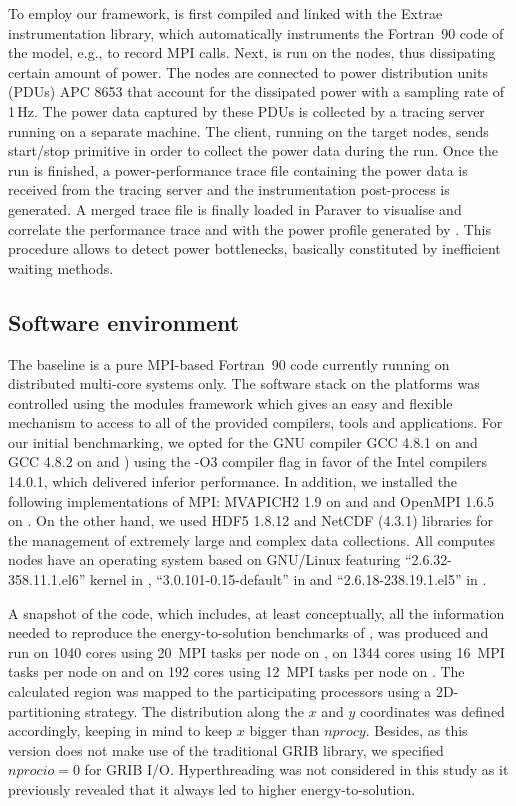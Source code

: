 To employ our framework, \cosmoart is first compiled and linked with the Extrae instrumentation library, which automatically  instruments the Fortran~90 code of the model, e.g., to record MPI calls.  Next, \cosmoart  is  run on  the  nodes,  thus dissipating  certain amount  of power. The  nodes are connected to power distribution units (PDUs)
APC 8653 that account for the dissipated power with a sampling rate of 1\,Hz. The power data captured by these PDUs is collected by a \pmlib tracing server running on a separate machine. The client, running on the target nodes, sends start/stop  primitive in order to collect
the power data during the \cosmoart run. Once  the run  is finished,  a power-performance trace file containing the power data is received from the tracing server and the instrumentation post-process is generated. A merged trace file is finally loaded in Paraver to visualise and correlate the performance trace and with the power profile generated by \cosmoart. This procedure allows to detect power bottlenecks, basically constituted by inefficient waiting methods.

\subsection{Software environment}
\label{subsec:3.2}

The \cosmoart  baseline is a  pure MPI-based  Fortran~90 code
currently  running  on   distributed  multi-core  systems  only.   The
software stack on the platforms was controlled using the modules
framework which gives an easy  and flexible mechanism to access to all
of the  provided compilers, tools  and applications.  For  our initial
benchmarking,   we  opted   for   the  GNU   compiler  GCC 4.8.1   on
\monch and GCC 4.8.2 on  \pilat and \tinto) using the -O3 compiler
flag  in favor  of the  Intel compilers 14.0.1,  which delivered inferior
performance.  In  addition, we installed the following implementations of MPI: MVAPICH2 1.9 on \monch and \pilat and  OpenMPI 1.6.5 on \tinto. On the other hand, we  used HDF5 1.8.12 and NetCDF  (4.3.1) libraries for  the management  of extremely  large and
complex data collections.  All computes nodes have an operating system
based on GNU/Linux featuring ``2.6.32-358.11.1.el6'' kernel in
\monch, ``3.0.101-0.15-default'' in \pilat and ``2.6.18-238.19.1.el5'' in \tinto.

A snapshot of the code,  which includes, at least conceptually, all the
information needed  to reproduce the  energy-to-solution benchmarks of
\cosmoart, was produced and run on 1040 cores using 20~MPI
tasks  per node on  \monch, on 1344 cores  using 16~MPI
tasks per node on  \pilat and on 192 cores  using 12~MPI
tasks per node on \tinto.  The calculated region was mapped
to the participating processors using a 2D-partitioning strategy.  The
distribution along the $x$ and $y$ coordinates was defined accordingly, keeping in mind
to keep $x$  bigger  than  $nprocy$.
Besides,  as this  version does not  make use  of the  traditional GRIB
library, we  specified $nprocio=0$  for GRIB I/O.   Hyperthreading was
not considered in this study  as it previously revealed that it always
led to higher energy-to-solution.